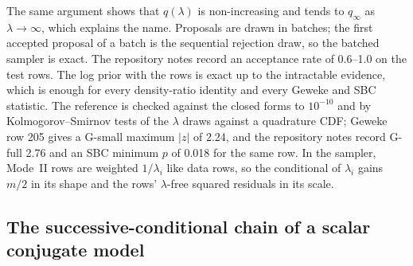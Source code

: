 The same argument shows that $q(\lambda)$ is non-increasing and tends to $q_\infty$ as $\lambda \to
\infty$, which explains the name.
Proposals are drawn in batches; the first accepted proposal of a batch is the sequential rejection
draw, so the batched sampler is exact.
The repository notes record an acceptance rate of 0.6--1.0 on the test rows.
The log prior with the rows is exact up to the intractable evidence, which is enough for every
density-ratio identity and every Geweke and SBC statistic.
The reference is checked against the closed forms to $10^{-10}$ and by Kolmogorov--Smirnov tests of
the $\lambda$ draws against a quadrature CDF; Geweke row 205 gives a G-small maximum $|z|$ of 2.24,
and the repository notes record G-full 2.76 and an SBC minimum $p$ of 0.018 for the same row.
In the sampler, Mode~II rows are weighted $1/\lambda_i$ like data rows, so the conditional of
$\lambda_i$ gains $m/2$ in its shape and the rows' $\lambda$-free squared residuals in its scale.

\subsection{The successive-conditional chain of a scalar conjugate model}\label{app:ar1-rule}

